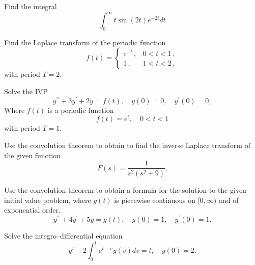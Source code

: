 \documentclass[11pt]{article}
\begin{document}
\makelabtitle


\begin{problem}
Find the integral
\[\int_{0}^{\infty}t\sin (2t) e^{-2t}dt\]
\end{problem}



\begin{problem}
Find the Laplace transform of the periodic function
\[f(t)=\left\{\begin{array}{ll}
        e^{-t}\,, & 0<t<1\,,\\
        1\,, & 1<t<2\,,
       \end{array}\right.
\]
with period $T=2$.
\end{problem}


\begin{problem}
Solve the IVP
\[ y^{\prime \prime} + 3 y^{\prime} + 2y = f(t), \quad y(0) = 0, \quad y^{\prime}(0) = 0, \]
Where $f(t)$ is a periodic function
\[ f(t) = e^t, \quad 0 < t < 1\]
with period $T=1$.
\end{problem}




\begin{problem}
Use the convolution theorem to obtain to find the inverse Laplace transform of the given function
\begin{equation*}
F(s) = \dfrac{1}{s^2 (s^2+9)}.
\end{equation*}
\end{problem}





\begin{problem}
Use the convolution theorem to obtain a formula for the solution to the given initial value problem, where $g(t)$ is piecewise continuous on $[0,\infty)$ and of exponential order.
\begin{equation*}
y^{\prime \prime} + 4y^{\prime} + 5 y = g(t), \quad y(0)=1, \quad y^{\prime}(0)=1.
\end{equation*}
\end{problem}



\begin{problem}
Solve the integro--differential equation
\[y'-2\int_{0}^{t}e^{t-v}y(v)dv=t,\quad y(0)=2.\]
\end{problem}
\end{document}
